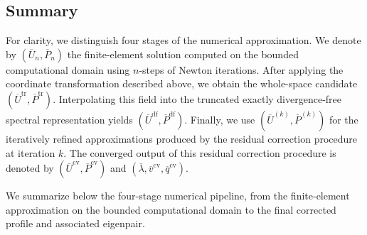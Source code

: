 \documentclass[11pt,a4paper]{article}
\numberwithin{equation}{section}
\begin{document}
\subsection{Summary}\label{sec:sum}

For clarity, we distinguish four stages of the numerical approximation.
We denote by $(\overline{U}_{n},\overline{P}_{n})$ the finite-element solution
computed on the bounded computational domain using $n$-steps of Newton iterations. After applying the
coordinate transformation described above, we obtain the whole-space
candidate $(\overline{U}^{\mathrm{tr}},\overline{P}^{\mathrm{tr}})$. Interpolating this field
into the truncated exactly divergence-free spectral representation
yields $(\overline{U}^{\mathrm{df}},\overline{P}^{\mathrm{df}})$. Finally, we use $(\overline{U}^{(k)},\overline{P}^{(k)})$ for the iteratively refined approximations produced by
the residual correction procedure at iteration $k$. The converged output of this residual correction procedure is denoted by $(\overline{U}^{\mathrm{cv}},\overline{P}^{\mathrm{cv}})$ and $(\overline{\lambda},\overline{v}^{\mathrm{cv}},\overline{q}^{\mathrm{cv}})$.

We summarize below the four-stage numerical pipeline, from the finite-element approximation on the bounded computational domain to the final corrected profile and associated eigenpair.
\end{document}
